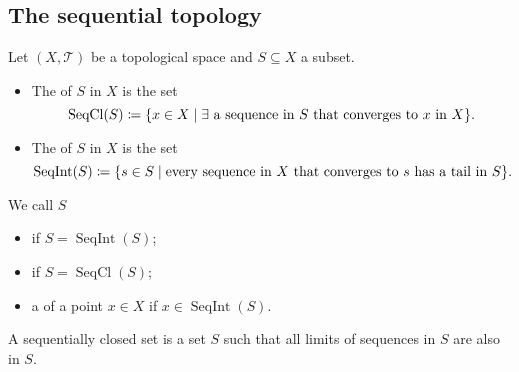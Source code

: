\subsection{The sequential topology}
\begin{definition}
Let $(X,\mathcal{T})$ be a topological space and $S\subseteq X$ a subset.
\begin{itemize}
\item The  of $S$ in $X$ is the set
\[ \operatorname{SeqCl}(S) \defeq \setbuilder{x\in X}{\text{$\exists$ a sequence in $S$ that converges to $x$ in $X$}}. \]
\item The  of $S$ in $X$ is the set
\[ \operatorname{SeqInt}(S) \defeq \setbuilder{s\in S}{\text{every sequence in $X$ that converges to $s$ has a tail in $S$}}. \]
\end{itemize}
We call $S$
\begin{itemize}
\item {} if $S = \operatorname{SeqInt}(S)$;
\item {} if $S = \operatorname{SeqCl}(S)$;
\item a  of a point $x\in X$ if $x\in \operatorname{SeqInt}(S)$.
\end{itemize}
\end{definition}
A sequentially closed set is a set $S$ such that all limits of sequences in $S$ are also in $S$.


